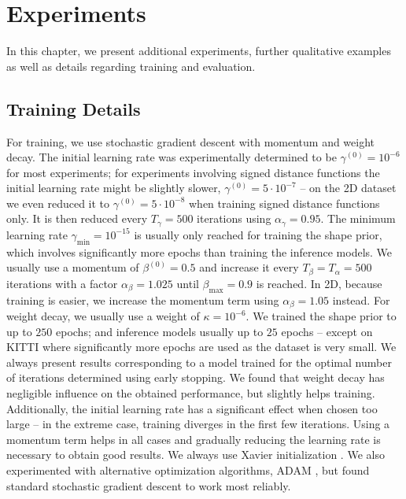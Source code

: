 \chapter{Experiments}
\label{ch:appendix-experiments}

In this chapter, we present additional experiments, further qualitative examples
as well as details regarding training and evaluation.

\section{Training Details}

For training, we use stochastic gradient descent with momentum and weight decay.
The initial learning rate was experimentally determined to be $\gamma^{(0)} = 10^{-6}$
for most experiments; for experiments involving signed distance functions the initial
learning rate might be slightly slower, \eg $\gamma^{(0)} = 5\cdot10^{-7}$ -- 
on the 2D dataset we even reduced it to $\gamma^{(0)} = 5\cdot10^{-8}$ when training
signed distance functions only.
It is then reduced every $T_{\gamma} = 500$ iterations using $\alpha_{\gamma} = 0.95$.
The minimum learning rate $\gamma_{\min} = 10^{-15}$ is usually only reached
for training the shape prior, which involves significantly more epochs than
training the inference models. We usually use a momentum of $\beta^{(0)} = 0.5$
and increase it every $T_{\beta} = T_{\alpha} = 500$ iterations with a factor
$\alpha_{\beta} = 1.025$ until $\beta_{\max} = 0.9$ is reached. In 2D,
because training is easier, we increase the momentum term using
$\alpha_{\beta} = 1.05$ instead. For weight decay,
we usually use a weight of $\kappa = 10^{-6}$. We trained the shape prior to
up to $250$ epochs; and inference models usually up to $25$ epochs -- except
on KITTI \cite{GeigerLenzUrtasun:2012,GeigerLenzStillerUrtasun:2013}
where significantly more epochs are used as the dataset is very small.
We always present results corresponding to a model trained for the optimal
number of iterations determined using early stopping.
We found that weight decay has negligible influence on the obtained performance,
but slightly helps training. Additionally, the initial learning
rate has a significant effect when chosen
too large -- in the extreme case, training diverges in the first few iterations.
Using a momentum term helps in all cases and gradually reducing the learning
rate is necessary to obtain good results. We always use Xavier initialization
\cite{GlorotBengio:2010}. We also experimented with
alternative optimization algorithms, \eg ADAM \cite{KingmaBa:2014}, but
found standard stochastic gradient descent to work most reliably.

